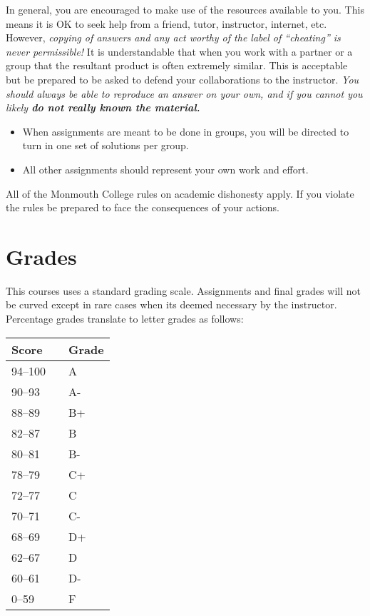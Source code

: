 \documentclass[10pt]{article}
\begin{document}
In general, you are encouraged to make use of the resources available to you.  This means it is OK to seek help from a friend, tutor, instructor, internet, etc.  However, \textit{copying of answers and any act worthy of the label of ``cheating'' is never permissible!}  It is understandable that when you work with a partner or a group that the resultant product is often extremely similar.  This is acceptable but be prepared to be asked to defend your collaborations to the instructor.  \textit{You should always be able to reproduce an answer on your own, and if you cannot you likely \textbf{do not really known the material.}}
\begin{itemize}
\item When assignments are meant to be done in groups, you will be directed to turn in one set of solutions per group.
\item All other assignments should represent your own work and effort.
\end{itemize}
All of the Monmouth College rules on academic dishonesty apply.  If you violate the rules be prepared to face the consequences of your actions.


\newpage
\section{Grades}

This courses uses a standard grading scale.  Assignments and final grades will not be curved except in rare cases when its deemed necessary by the instructor.  Percentage grades translate to letter grades as follows:

\begin{center}
\begin{small}
\begin{tabular}{lcl}
Score & & Grade \\ \toprule
94--100 & & A \\
90--93 & & A- \\
88--89 & & B+ \\
82--87 & & B \\
80--81 & & B- \\
78--79 & & C+ \\
72--77 & & C \\
70--71 & & C- \\
68--69 & & D+ \\
62--67 & & D \\
60--61 & & D- \\
0--59 & & F
\end{tabular}
\end{small}
\end{center}
\end{document}
